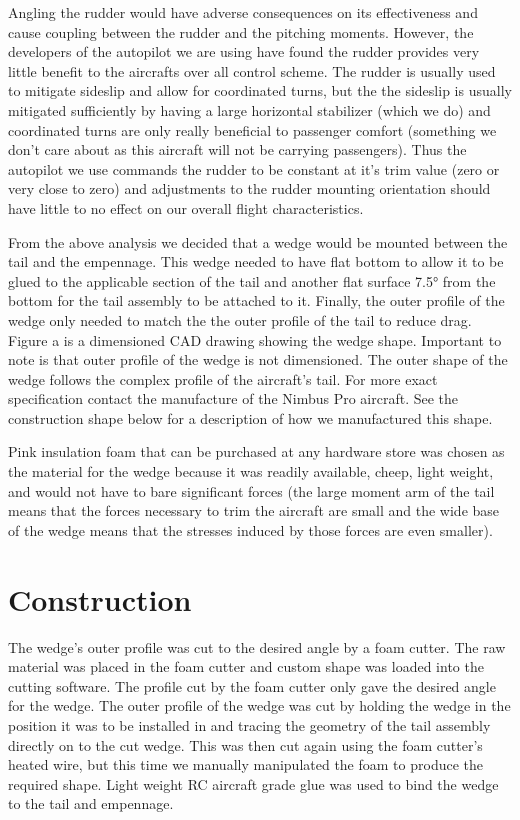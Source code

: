 \documentclass[]{auvsi_doc}
\begin{document}
 Angling the rudder would have adverse consequences on its effectiveness and cause coupling between the rudder and the pitching moments. However, the developers of the autopilot we are using have found the rudder provides very little benefit to the aircrafts over all control scheme. The rudder is usually used to mitigate sideslip and allow for coordinated turns, but the the sideslip is usually mitigated sufficiently by having a large horizontal stabilizer (which we do) and coordinated turns are only really beneficial to passenger comfort (something we don't care about as this aircraft will not be carrying passengers). Thus the autopilot we use commands the rudder to be constant at it's trim value (zero or very close to zero) and adjustments to the rudder mounting orientation should have little to no effect on our overall flight characteristics.
 
 From the above analysis we decided that a wedge would be mounted between the tail and the empennage. This wedge needed to have flat bottom to allow it to be glued to the applicable section of the tail and another flat surface 7.5° from the bottom for the tail assembly to be attached to it. Finally, the outer profile of the wedge only needed to match the the outer profile of the tail to reduce drag. Figure a is a dimensioned CAD drawing showing the wedge shape. Important to note is that outer profile of the wedge is not dimensioned. The outer shape of the wedge follows the complex profile of the aircraft's tail. For more exact specification contact the manufacture of the Nimbus Pro aircraft. See the construction shape below for a description of how we manufactured this shape. 
 
Pink insulation foam that can be purchased at any hardware store was chosen as the material for the wedge because it was readily available, cheep, light weight, and would not have to bare significant forces (the large moment arm of the tail means that the forces necessary to trim the aircraft are small and the wide base of the wedge means that the stresses induced by those forces are even smaller). 

\section{Construction}

The wedge's outer profile was cut to the desired angle by a foam cutter. The raw material was placed in the foam cutter and custom shape was loaded into the cutting software. The profile cut by the foam cutter only gave the desired angle for the wedge. The outer profile of the wedge was cut by holding the wedge in the position it was to be installed in and tracing the geometry of the tail assembly directly on to the cut wedge. This was then cut again using the foam cutter's heated wire, but this time we manually manipulated the foam to produce the required shape. Light weight RC aircraft grade glue was used to bind the wedge to the tail and empennage.
\end{document}
